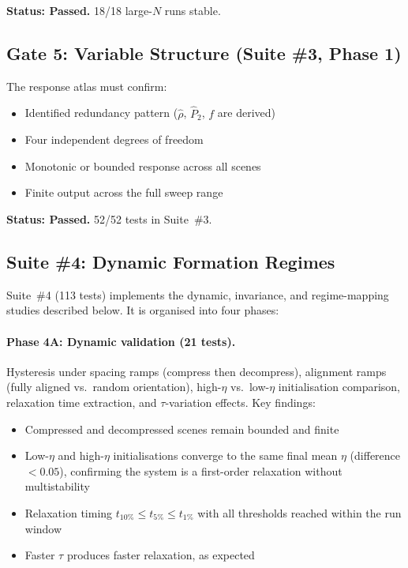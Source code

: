 \documentclass[11pt]{article}
\begin{document}
\textbf{Status: Passed.} 18/18 large-$N$ runs stable.

\subsection{Gate 5: Variable Structure (Suite \#3, Phase 1)}

The response atlas must confirm:
\begin{itemize}
    \item Identified redundancy pattern ($\hat{\rho}$, $\hat{P}_2$, $f$
          are derived)
    \item Four independent degrees of freedom
    \item Monotonic or bounded response across all scenes
    \item Finite output across the full sweep range
\end{itemize}

\textbf{Status: Passed.} 52/52 tests in Suite~\#3.

\subsection{Suite \#4: Dynamic Formation Regimes}

Suite~\#4 (113 tests) implements the dynamic, invariance, and regime-mapping
studies described below.  It is organised into four phases:

\paragraph{Phase 4A: Dynamic validation (21 tests).}
Hysteresis under spacing ramps (compress then decompress), alignment ramps
(fully aligned vs.\ random orientation), high-$\eta$ vs.\ low-$\eta$
initialisation comparison, relaxation time extraction, and $\tau$-variation
effects.  Key findings:
\begin{itemize}
    \item Compressed and decompressed scenes remain bounded and finite
    \item Low-$\eta$ and high-$\eta$ initialisations converge to the same
          final mean $\eta$ (difference $< 0.05$), confirming the system is
          a first-order relaxation without multistability
    \item Relaxation timing $t_{10\%} \le t_{5\%} \le t_{1\%}$ with all
          thresholds reached within the run window
    \item Faster $\tau$ produces faster relaxation, as expected
\end{itemize}
\end{document}
